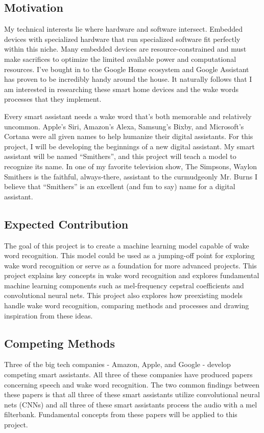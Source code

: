 \documentclass[conference]{IEEEtran}
\begin{document}
\subsection{Motivation}

My technical interests lie where hardware and software intersect.
Embedded devices with specialized hardware that run specialized software
fit perfectly within this niche.
Many embedded devices are resource-constrained and must make sacrifices
to optimize the limited available power and computational resources.
I've bought in to the Google Home ecosystem and Google Assistant 
has proven to be incredibly handy around the house.
It naturally follows that I am interested in researching these smart home devices
and the wake words processes that they implement.

Every smart assistant needs a wake word that's both memorable and relatively uncommon.
Apple's Siri, Amazon's Alexa, Samsung's Bixby, and Microsoft's Cortana
were all given names to help humanize their digital assistants.
For this project, I will be developing the beginnings of a new digital assistant.
My smart assistant will be named ``Smithers'',
and this project will teach a model to recognize its name.
In one of my favorite television show, The Simpsons, 
Waylon Smithers is the faithful, always-there, assistant to the curmudgeonly Mr. Burns 
I believe that ``Smithers'' is an excellent (and fun to say) name for a digital assistant.

\subsection{Expected Contribution}
The goal of this project is to create a machine learning model capable of wake word recognition.
This model could be used as a jumping-off point for exploring wake word recognition
or serve as a foundation for more advanced projects.
This project explains key concepts in wake word recognition
and explores fundamental machine learning components 
such as mel-frequency cepstral coefficients and convolutional neural nets.
This project also explores how preexisting models handle wake word recognition,
comparing methods and processes and drawing inspiration from these ideas.

\subsection{Competing Methods}
Three of the big tech companies - Amazon, Apple, and Google - 
develop competing smart assistants.
All three of these companies have produced papers concerning speech and wake word recognition.
The two common findings between these papers is that
all three of these smart assistants utilize convolutional neural nets (CNNs)
and all three of these smart assistants process the audio with a mel filterbank.
Fundamental concepts from these papers will be applied to this project.
\end{document}
